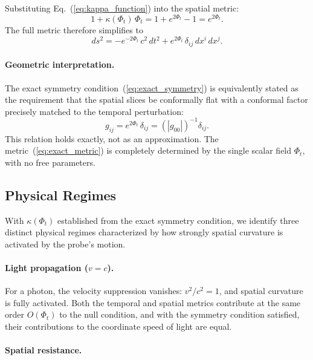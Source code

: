 \documentclass[12pt]{article}
\begin{document}
Substituting Eq.~(\ref{eq:kappa_function}) into the spatial metric:
$$
1 + \kappa(\Phi_t)\,\Phi_t = 1 + e^{2\Phi_t} - 1 = e^{2\Phi_t}.
$$
The full metric therefore simplifies to
\begin{equation}
ds^2 = -e^{-2\Phi_t}\,c^2\,dt^2 + e^{2\Phi_t}\,\delta_{ij}\,dx^i\,dx^j.
\label{eq:exact_metric}
\end{equation}

\paragraph{Geometric interpretation.}

The exact symmetry condition~(\ref{eq:exact_symmetry}) is equivalently stated as the requirement that the spatial slices be conformally flat with a conformal factor precisely matched to the temporal perturbation:
\begin{equation}
g_{ij} = e^{2\Phi_t}\,\delta_{ij} = \left(|g_{00}|\right)^{-1}\delta_{ij}.
\end{equation}
This relation holds exactly, not as an approximation. The metric~(\ref{eq:exact_metric}) is completely determined by the single scalar field $\Phi_t$, with no free parameters.

\subsection{Physical Regimes}
\label{sec:regimes}

With $\kappa(\Phi_t)$ established from the exact symmetry condition, we identify three distinct physical regimes characterized by how strongly spatial curvature is activated by the probe's motion.

\paragraph{Light propagation ($v = c$).}

For a photon, the velocity suppression vanishes: $v^2/c^2 = 1$, and spatial curvature is fully activated. Both the temporal and spatial metrics contribute at the same order $O(\Phi_t)$ to the null condition, and with the symmetry condition satisfied, their contributions to the coordinate speed of light are equal.

\paragraph{Spatial resistance.}
\end{document}
